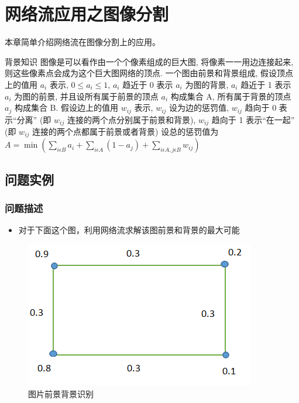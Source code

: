 \chapter{网络流应用之图像分割}


{\centering 本章简单介绍网络流在图像分割上的应用。}


\begin{definition}{背景知识}{}
	图像是可以看作由一个个像素组成的巨大图, 将像素一一用边连接起来, 则这些像素点会成为这个巨大图网络的顶点.
	一个图由前景和背景组成, 假设顶点上的值用 $a_i$ 表示, $ 0 \leq a_i \leq 1 $,  $a_i$ 趋近于 0 表示 $a_i$ 为图的背景, $a_i$ 趋近于 1 表示 $a_i$ 为图的前景, 并且设所有属于前景的顶点 $a_i$ 构成集合 A, 所有属于背景的顶点 $a_j$ 构成集合 B.
	假设边上的值用 $w_{ij}$ 表示, $w_{ij}$ 设为边的惩罚值, $w_{ij}$ 趋向于 0 表示“分离” (即 $w_{ij}$ 连接的两个点分别属于前景和背景), $w_{ij}$ 趋向于 1 表示“在一起” (即 $w_{ij}$ 连接的两个点都属于前景或者背景)
	设总的惩罚值为 $ A = \min\left(\sum_{i \epsilon B}a_i +  \sum_{i \epsilon A}(1 - a_j) + \sum_{i \epsilon A, j \epsilon B}w_{ij} \right) $
\end{definition}


\section{问题实例}
\subsection{问题描述}
\begin{itemize}
	\item 对于下面这个图，利用网络流求解该图前景和背景的最大可能
\end{itemize}

\begin{figure}[htb]
	\centering
	\includegraphics[scale=0.8]{image/Image-segmentation2.png}
	\caption{图片前景背景识别}\label{fig:image-seg-1}
\end{figure}

